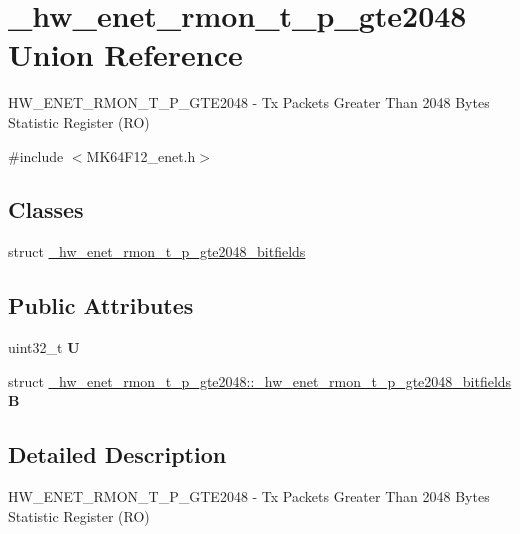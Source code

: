 \hypertarget{union__hw__enet__rmon__t__p__gte2048}{}\section{\+\_\+hw\+\_\+enet\+\_\+rmon\+\_\+t\+\_\+p\+\_\+gte2048 Union Reference}
\label{union__hw__enet__rmon__t__p__gte2048}


H\+W\+\_\+\+E\+N\+E\+T\+\_\+\+R\+M\+O\+N\+\_\+\+T\+\_\+\+P\+\_\+\+G\+T\+E2048 -\/ Tx Packets Greater Than 2048 Bytes Statistic Register (RO)  




{\ttfamily \#include $<$M\+K64\+F12\+\_\+enet.\+h$>$}

\subsection*{Classes}
\begin{DoxyCompactItemize}
\item 
struct \hyperlink{struct__hw__enet__rmon__t__p__gte2048_1_1__hw__enet__rmon__t__p__gte2048__bitfields}{\+\_\+hw\+\_\+enet\+\_\+rmon\+\_\+t\+\_\+p\+\_\+gte2048\+\_\+bitfields}
\end{DoxyCompactItemize}
\subsection*{Public Attributes}
\begin{DoxyCompactItemize}
\item 
uint32\+\_\+t {\bfseries U}\hypertarget{union__hw__enet__rmon__t__p__gte2048_aefaa9b2bba87be99046d85c2aa27414a}{}\label{union__hw__enet__rmon__t__p__gte2048_aefaa9b2bba87be99046d85c2aa27414a}

\item 
struct \hyperlink{struct__hw__enet__rmon__t__p__gte2048_1_1__hw__enet__rmon__t__p__gte2048__bitfields}{\+\_\+hw\+\_\+enet\+\_\+rmon\+\_\+t\+\_\+p\+\_\+gte2048\+::\+\_\+hw\+\_\+enet\+\_\+rmon\+\_\+t\+\_\+p\+\_\+gte2048\+\_\+bitfields} {\bfseries B}\hypertarget{union__hw__enet__rmon__t__p__gte2048_af1add300928b1a327b777109d941f780}{}\label{union__hw__enet__rmon__t__p__gte2048_af1add300928b1a327b777109d941f780}

\end{DoxyCompactItemize}


\subsection{Detailed Description}
H\+W\+\_\+\+E\+N\+E\+T\+\_\+\+R\+M\+O\+N\+\_\+\+T\+\_\+\+P\+\_\+\+G\+T\+E2048 -\/ Tx Packets Greater Than 2048 Bytes Statistic Register (RO) 

